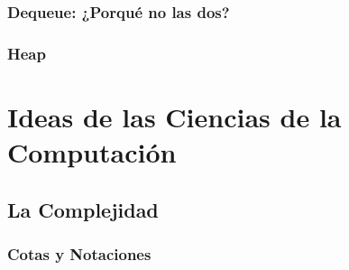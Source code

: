 \documentclass[12pt, fleqn]{report}                             %
\theoremstyle{break}                                            %
\begin{document}
        \clearpage
        \section{Dequeue: ¿Porqué no las dos?}

        \clearpage
        \section{Heap}


\part{Ideas de las Ciencias de la Computación}
\label{part:IdeasDeCienciasDeLaComputacion}
    

    \clearpage
    \chapter{La Complejidad}

        \section{Cotas y Notaciones}

\end{document}
